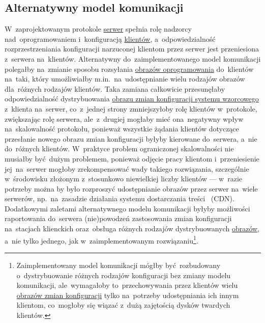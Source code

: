 \documentclass[thesis]{subfiles}
\begin{document}

\subsection{Alternatywny model komunikacji}

W~zaprojektowanym protokole \hyperref[sec:srv-app]{serwer} spełnia rolę nadzorcy nad~oprogramowaniem i~konfiguracją \hyperref[sec:cli-app]{klientów}, a~odpowiedzialność rozprzestrzeniania konfiguracji narzuconej klientom przez serwer jest przeniesiona z~serwera na~klientów. Alternatywny do~zaimplementowanego model komunikacji polegałby na~zmianie sposobu rozsyłania \hyperref[sec:obraz-zmian-konfiguracji]{obrazów oprogramowania} do~klientów na~taki, który umożliwiałby m.in.~na~udostępnianie wielu rodzajów obrazów dla~różnych rodzajów klientów. Taka zamiana całkowicie przesunęłaby odpowiedzialność dystrybuowania \hyperref[sec:obraz-zmian-konfiguracji]{obrazu zmian konfiguracji systemu wzorcowego} z~klienta na~serwer, co~z~jednej strony zmniejszyłoby rolę klientów w~protokole, zwiększając rolę serwera, ale~z~drugiej mogłaby mieć ona~negatywny wpływ na~skalowalność protokołu, ponieważ wszystkie żądania klientów dotyczące przesłanie nowego obrazu zmian konfiguracji byłyby kierowane do~serwera, a~nie do~różnych klientów. W~praktyce problem ograniczonej skalowalności nie musiałby być dużym problemem, ponieważ odjęcie pracy klientom i~przeniesienie jej~na~serwer mogłoby zrekompensować wady takiego rozwiązania, szczególnie w~środowisku złożonym z~stosunkowo niewielkiej liczby klientów --- w~razie potrzeby można by było rozproszyć udostępnianie obrazów przez serwer na~wiele serwerów, np.~na~zasadzie działania systemu dostarczania treści ~(CDN). Dodatkowymi zaletami alternatywnego modelu komunikacji byłyby możliwości raportowania do~serwera (nie)powodzeń zastosowania zmian konfiguracji na~stacjach klienckich oraz~obsługa różnych rodzajów dystrybuowanych \hyperref[sec:obraz-zmian-konfiguracji]{obrazów}, a~nie tylko jednego, jak w~zaimplementowanym rozwiązaniu\footnote{Zaimplementowany model komunikacji mógłby być~rozbudowany o~dystrybuowanie różnych rodzajów konfiguracji bez zmiany modelu komunikacji, ale~wymagałoby to~przechowywania przez klientów wielu \hyperref[sec:obraz-zmian-konfiguracji]{obrazów zmian konfiguracji} tylko na~potrzeby udostępniania ich innym klientom, co~mogłoby się wiązać z~dużą zajętością dysków twardych klientów.}.
\end{document}
